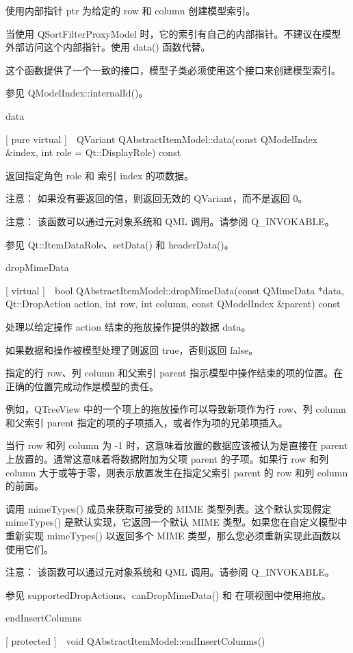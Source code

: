 使用内部指针 ptr 为给定的 row 和 column 创建模型索引。

当使用 QSortFilterProxyModel 时，它的索引有自己的内部指针。不建议在模型外部访问这个内部指针。使用 data() 函数代替。

这个函数提供了一个一致的接口，模型子类必须使用这个接口来创建模型索引。

参见 QModelIndex::internalId()。

data

[ pure virtual ] QVariant QAbstractItemModel::data(const QModelIndex \&index, int role = Qt::DisplayRole) const

返回指定角色 role 和 索引 index 的项数据。

注意： 如果没有要返回的值，则返回无效的 QVariant，而不是返回 0。

注意： 该函数可以通过元对象系统和 QML 调用。请参阅 Q\_INVOKABLE。

参见 Qt::ItemDataRole、setData() 和 headerData()。

dropMimeData

[ virtual ] bool QAbstractItemModel::dropMimeData(const QMimeData *data, Qt::DropAction action, int row, int column, const QModelIndex \&parent) const

处理以给定操作 action 结束的拖放操作提供的数据 data。

如果数据和操作被模型处理了则返回 true，否则返回 false。

指定的行 row、列 column 和父索引 parent 指示模型中操作结束的项的位置。在正确的位置完成动作是模型的责任。

例如，QTreeView 中的一个项上的拖放操作可以导致新项作为行 row、列 column 和父索引 parent 指定的项的子项插入，或者作为项的兄弟项插入。

当行 row 和列 column 为 -1 时，这意味着放置的数据应该被认为是直接在 parent 上放置的。通常这意味着将数据附加为父项 parent 的子项。如果行 row 和列 column 大于或等于零，则表示放置发生在指定父索引 parent 的 row 和列 column 的前面。

调用 mimeTypes() 成员来获取可接受的 MIME 类型列表。这个默认实现假定 mimeTypes() 是默认实现，它返回一个默认 MIME 类型。如果您在自定义模型中重新实现 mimeTypes() 以返回多个 MIME 类型，那么您必须重新实现此函数以使用它们。

注意： 该函数可以通过元对象系统和 QML 调用。请参阅 Q\_INVOKABLE。

参见 supportedDropActions、canDropMimeData() 和 在项视图中使用拖放。

endInsertColumns

[ protected ] void QAbstractItemModel::endInsertColumns()

